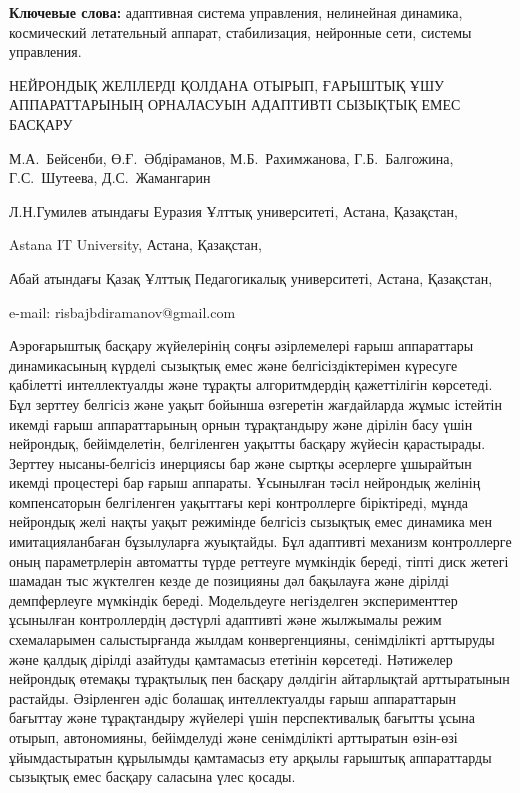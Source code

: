 {\bfseries Ключевые слова:} адаптивная система управления, нелинейная
динамика, космический летательный аппарат, стабилизация, нейронные сети,
системы управления.

\begin{header}
НЕЙРОНДЫҚ ЖЕЛІЛЕРДІ ҚОЛДАНА ОТЫРЫП, ҒАРЫШТЫҚ ҰШУ АППАРАТТАРЫНЫҢ ОРНАЛАСУЫН АДАПТИВТІ СЫЗЫҚТЫҚ ЕМЕС БАСҚАРУ

М.А.~Бейсенби,
Ө.Ғ.~Әбдіраманов\envelope,
М.Б.~Рахимжанова,
Г.Б.~Балгожина,
Г.С.~Шутеева,
Д.С.~Жамангарин
\end{header}

\begin{affil}
Л.Н.Гумилев атындағы Еуразия Ұлттық университеті, Астана, Қазақстан,

Astana IT University, Астана, Қазақстан,

Абай атындағы Қазақ Ұлттық Педагогикалық университеті, Астана, Қазақстан,

e-mail: risbajbdiramanov@gmail.com
\end{affil}

Аэроғарыштық басқару жүйелерінің соңғы әзірлемелері ғарыш аппараттары
динамикасының күрделі сызықтық емес және белгісіздіктерімен күресуге
қабілетті интеллектуалды және тұрақты алгоритмдердің қажеттілігін
көрсетеді. Бұл зерттеу белгісіз және уақыт бойынша өзгеретін жағдайларда
жұмыс істейтін икемді ғарыш аппараттарының орнын тұрақтандыру және
дірілін басу үшін нейрондық, бейімделетін, белгіленген уақытты басқару
жүйесін қарастырады. Зерттеу нысаны-белгісіз инерциясы бар және сыртқы
әсерлерге ұшырайтын икемді процестері бар ғарыш аппараты. Ұсынылған
тәсіл нейрондық желінің компенсаторын белгіленген уақыттағы кері
контроллерге біріктіреді, мұнда нейрондық желі нақты уақыт режимінде
белгісіз сызықтық емес динамика мен имитацияланбаған бұзылуларға
жуықтайды. Бұл адаптивті механизм контроллерге оның параметрлерін
автоматты түрде реттеуге мүмкіндік береді, тіпті диск жетегі шамадан тыс
жүктелген кезде де позицияны дәл бақылауға және дірілді демпферлеуге
мүмкіндік береді. Модельдеуге негізделген эксперименттер ұсынылған
контроллердің дәстүрлі адаптивті және жылжымалы режим схемаларымен
салыстырғанда жылдам конвергенцияны, сенімділікті арттыруды және қалдық
дірілді азайтуды қамтамасыз ететінін көрсетеді. Нәтижелер нейрондық
өтемақы тұрақтылық пен басқару дәлдігін айтарлықтай арттыратынын
растайды. Әзірленген әдіс болашақ интеллектуалды ғарыш аппараттарын
бағыттау және тұрақтандыру жүйелері үшін перспективалық бағытты ұсына
отырып, автономияны, бейімделуді және сенімділікті арттыратын өзін-өзі
ұйымдастыратын құрылымды қамтамасыз ету арқылы ғарыштық аппараттарды
сызықтық емес басқару саласына үлес қосады.

